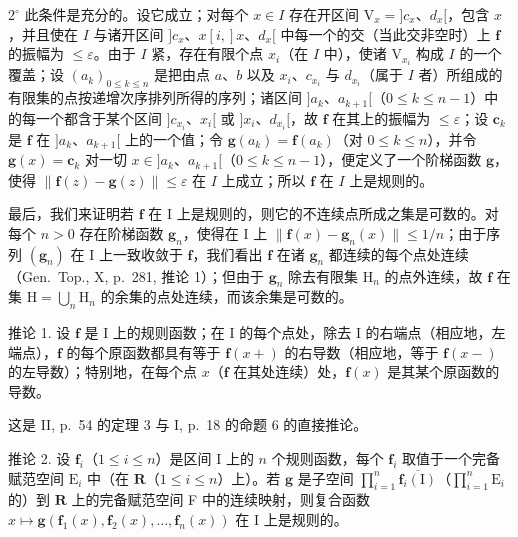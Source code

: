 \(2^{\circ}\) 此条件是充分的。设它成立；对每个 \(x \in I\) 存在开区间 \(\mathrm{V}_x = ]c_x\)、\(d_x[\)，包含 \(x\)，并且使在 \(I\) 与诸开区间 \(]c_x\)、\(x[i, ]x\)、\(d_x[\) 中每一个的交（当此交非空时）上 \(\mathbf{f}\) 的振幅为 \(\leqslant \varepsilon\)。由于 \(I\) 紧，存在有限个点 \(x_i\)（在 \(I\) 中），使诸 \(\mathrm{V}_{x_i}\) 构成 \(I\) 的一个覆盖；设 \((a_k)_{0 \leqslant k \leqslant n}\) 是把由点 \(a\)、\(b\) 以及 \(x_i\)、\(c_{x_i}\) 与 \(d_{x_i}\)（属于 \(I\) 者）所组成的有限集的点按递增次序排列所得的序列；诸区间 \(]a_k\)、\(a_{k+1}[\)（\(0 \leqslant k \leqslant n-1\)）中的每一个都含于某个区间 \(]c_{x_i}\)、\(x_i[\) 或 \(]x_i\)、\(d_{x_i}[\)，故 \(\mathbf{f}\) 在其上的振幅为 \(\leqslant \varepsilon\)；设 \(\mathbf{c}_k\) 是 \(\mathbf{f}\) 在 \(]a_k\)、\(a_{k+1}[\) 上的一个值；令 \(\mathbf{g}(a_k) = \mathbf{f}(a_k)\)（对 \(0 \leqslant k \leqslant n\)），并令 \(\mathbf{g}(x) = \mathbf{c}_k\) 对一切 \(x \in ]a_k\)、\(a_{k+1}[\)（\(0 \leqslant k \leqslant n-1\)），便定义了一个阶梯函数 \(\mathbf{g}\)，使得 \(\| \mathbf{f}(z) - \mathbf{g}(z) \| \leqslant \varepsilon\) 在 \(I\) 上成立；所以 \(\mathbf{f}\) 在 \(I\) 上是规则的。

最后，我们来证明若 \(\mathbf{f}\) 在 I 上是规则的，则它的不连续点所成之集是可数的。对每个 \(n > 0\) 存在阶梯函数 \(\mathbf{g}_n\)，使得在 I 上 \(\| \mathbf{f}(x) - \mathbf{g}_n(x)\| \leqslant 1 / n\)；由于序列 \((\mathbf{g}_n)\) 在 I 上一致收敛于 \(\mathbf{f}\)，我们看出 \(\mathbf{f}\) 在诸 \(\mathbf{g}_n\) 都连续的每个点处连续（Gen.~Top., X, p.~281, 推论 1）；但由于 \(\mathbf{g}_n\) 除去有限集 \(\mathrm{H}_n\) 的点外连续，故 \(\mathbf{f}\) 在集 \(\mathrm{H} = \bigcup_{n}\mathrm{H}_{n}\) 的余集的点处连续，而该余集是可数的。

推论 1. 设 \(\mathbf{f}\) 是 I 上的规则函数；在 I 的每个点处，除去 I 的右端点（相应地，左端点），\(\mathbf{f}\) 的每个原函数都具有等于 \(\mathbf{f}(x+)\) 的右导数（相应地，等于 \(\mathbf{f}(x-)\) 的左导数）；特别地，在每个点 \(x\)（\(\mathbf{f}\) 在其处连续）处，\(\mathbf{f}(x)\) 是其某个原函数的导数。

这是 II, p.~54 的定理 3 与 I, p.~18 的命题 6 的直接推论。

推论 2. 设 \(\mathbf{f}_i\)（\(1 \leqslant i \leqslant n\)）是区间 I 上的 \(n\) 个规则函数，每个 \(\mathbf{f}_i\) 取值于一个完备赋范空间 \(\mathrm{E}_i\) 中（在 \(\mathbf{R}\)（\(1 \leqslant i \leqslant n\)）上）。若 \(\mathbf{g}\) 是子空间 \(\prod_{i=1}^{n} \overline{\mathbf{f}_i(\mathrm{I})}\)（\(\prod_{i=1}^{n} \mathrm{E}_i\) 的）到 \(\mathbf{R}\) 上的完备赋范空间 F 中的连续映射，则复合函数 \(x \mapsto \mathbf{g}(\mathbf{f}_1(x), \mathbf{f}_2(x), \ldots, \mathbf{f}_n(x))\) 在 I 上是规则的。

